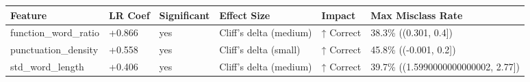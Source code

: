 \begin{tabular}{llllll}
\toprule
Feature & LR Coef & Significant & Effect Size & Impact & Max Misclass Rate \\
\midrule
function\_word\_ratio & +0.866 & yes & Cliff's delta (medium) & ↑ Correct & 38.3\% ((0.301, 0.4]) \\
punctuation\_density & +0.558 & yes & Cliff's delta (small) & ↑ Correct & 45.8\% ((-0.001, 0.2]) \\
std\_word\_length & +0.406 & yes & Cliff's delta (medium) & ↑ Correct & 39.7\% ((1.5990000000000002, 2.77]) \\
\bottomrule
\end{tabular}
